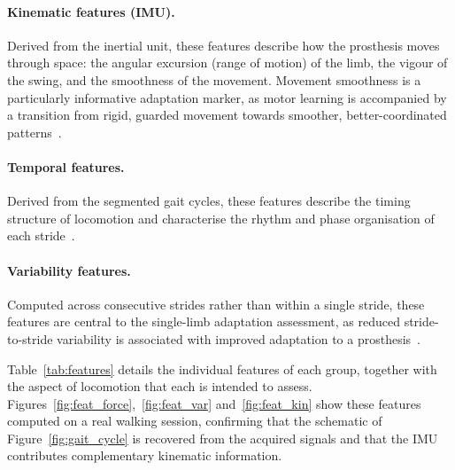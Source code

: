 \paragraph{Kinematic features (IMU).}
Derived from the inertial unit, these features describe how the prosthesis moves
through space: the angular excursion (range of motion) of the limb, the vigour
of the swing, and the smoothness of the movement. Movement smoothness is a
particularly informative adaptation marker, as motor learning is accompanied by
a transition from rigid, guarded movement towards smoother, better-coordinated
patterns~\cite{Wurdeman2014,Mannini2016}.

\paragraph{Temporal features.}
Derived from the segmented gait cycles, these features describe the timing
structure of locomotion and characterise the rhythm and phase organisation of
each stride~\cite{Jenkins2018,Zhang2022}.

\paragraph{Variability features.}
Computed across consecutive strides rather than within a single stride, these
features are central to the single-limb adaptation assessment, as reduced
stride-to-stride variability is associated with improved adaptation to a
prosthesis~\cite{Wurdeman2014,Blattler2024}.

Table~\ref{tab:features} details the individual features of each group, together
with the aspect of locomotion that each is intended to assess.
Figures~\ref{fig:feat_force},~\ref{fig:feat_var} and~\ref{fig:feat_kin} show
these features computed on a real walking session, confirming that the schematic
of Figure~\ref{fig:gait_cycle} is recovered from the acquired signals and that
the IMU contributes complementary kinematic information.

